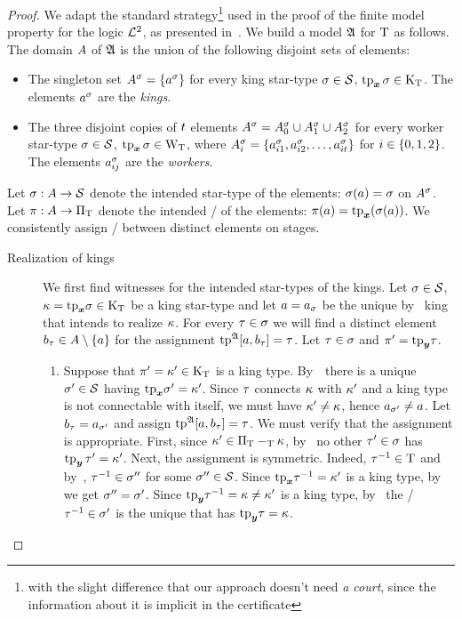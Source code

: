 \begin{proof}
We adapt the standard strategy\footnote{with the slight difference that our
approach doesn't need \emph{a court}, since the information about it is implicit
in the certificate} used in the proof of the finite model property for the logic
$\mathcal{L}^{2}$, as presented in~\cite{gradel1999logics}.
We build a model $\mathfrak{A}$ for $\mathrm{T}$ as follows.
The domain $A$ of $\mathfrak{A}$ is the union of the following disjoint sets of
elements:
\begin{itemize}
  \item
  The singleton set $A^{\sigma} = \left\{a^{\sigma}\right\}$ for every king star-type
  $\sigma\in\mathcal{S}$, $\operatorname{tp}_{\bm{x}}\sigma \in \mathrm{K}_{\mathrm{T}}$.
  The elements $a^{\sigma}$ are the \emph{kings}.
  \item 
  The three disjoint copies of $t$ elements
  $A^{\sigma} = A^{\sigma}_{0} \cup A^{\sigma}_{1} \cup A^{\sigma}_{2}$ for every
  worker star-type $\sigma \in \mathcal{S}$, $\operatorname{tp}_{\bm{x}}\sigma \in \mathrm{W}_{\mathrm{T}}$,
  where $A^{\sigma}_{i} = \left\{a^{\sigma}_{i 1}, a^{\sigma}_{i 2}, \dots,
  a^{\sigma}_{i t}\right\}$ for $i \in \left\{0,1,2\right\}$.
  The elements $a^{\sigma}_{i j}$ are the \emph{workers}.
\end{itemize}
Let $\sigma : A \to \mathcal{S}$ denote the intended star-type of the elements:
$\sigma(a) = \sigma$ on $A^{\sigma}$.
Let $\pi : A \to \Pi_{\mathrm{T}}$ denote the intended \onetype/ of the elements:
$\pi(a) = \mathrm{tp}_{\bm{x}}(\sigma(a))$.
We consistently assign \twotypes/ between distinct elements on stages.
\begin{description}
  \item[Realization of kings] We first find witnesses for the intended
  star-types of the kings.
  Let $\sigma \in \mathcal{S}$, $\kappa = \mathrm{tp}_{\bm{x}}\sigma \in \mathrm{K}_{\mathrm{T}}$ be a king
  star-type and let $a = a_{\sigma}$ be the unique by~ king that
  intends to realize $\kappa$.
  For every $\tau \in \sigma$ we will find a distinct element $b_{\tau} \in
  A \setminus \left\{a\right\}$ for the assignment $\operatorname{tp}^{\mathfrak{A}}[a,b_{\tau}] = \tau$.
  Let $\tau \in \sigma$ and ${\pi'} = \mathrm{tp}_{\bm{y}}\tau$.
  \begin{enumerate}
  \item 
  Suppose that ${\pi'} = {\kappa'} \in \mathrm{K}_{\mathrm{T}}$ is a king type.
  By~\ there is a unique ${\sigma'} \in \mathcal{S}$ having $\mathrm{tp}_{\bm{x}}{\sigma'} =
  {\kappa'}$.
  Since $\tau$ connects $\kappa$ with ${\kappa'}$ and a king type is not connectable
  with itself, we must have ${\kappa'} \neq \kappa$, hence $a_{{\sigma'}} \neq a$.
  Let $b_{\tau} = a_{{\sigma'}}$ and assign $\operatorname{tp}^{\mathfrak{A}}[a,b_{\tau}] = \tau$.
  We must verify that the assignment is appropriate.
  First, since ${\kappa'} \in \Pi_{\mathrm{T}} -_{\mathrm{T}} \kappa$, by~ no other
  ${\tau'} \in \sigma$ has $\operatorname{tp}_{\bm{y}}{\tau'} = {\kappa'}$.
  Next, the assignment is symmetric.
  Indeed, $\tau^{-1} \in \mathrm{T}$ and by~, $\tau^{-1} \in \sigma''$
  for some $\sigma'' \in \mathcal{S}$. Since $\mathrm{tp}_{\bm{x}}\tau^{-1} = {\kappa'}$ is a king type,
  by~ we get $\sigma'' = {\sigma'}$.
  Since $\mathrm{tp}_{\bm{y}}\tau^{-1} = \kappa \neq {\kappa'}$ is a king type,
  by~ the \twotype/ $\tau^{-1} \in {\sigma'}$ is the unique that
  has $\mathrm{tp}_{\bm{y}}\tau = \kappa$.
  

\end{enumerate}
\end{description}
\end{proof}
